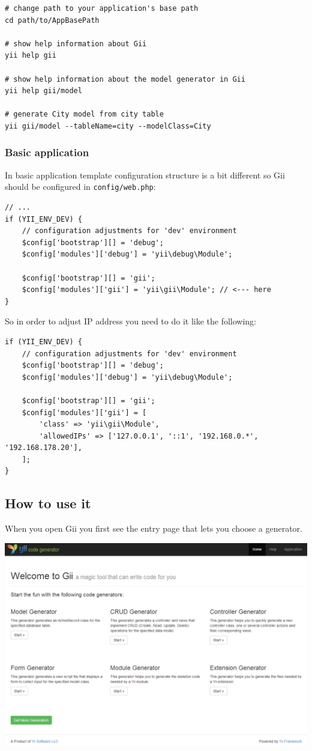 \begin{lstlisting}
# change path to your application's base path
cd path/to/AppBasePath

# show help information about Gii
yii help gii

# show help information about the model generator in Gii
yii help gii/model

# generate City model from city table
yii gii/model --tableName=city --modelClass=City
\end{lstlisting}
\subsubsection{Basic application}
In basic application template configuration structure is a bit different so Gii should be configured in
\lstinline|config/web.php|:

\lstset{language=php}\begin{lstlisting}
// ...
if (YII_ENV_DEV) {
    // configuration adjustments for 'dev' environment
    $config['bootstrap'][] = 'debug';
    $config['modules']['debug'] = 'yii\debug\Module';

    $config['bootstrap'][] = 'gii';
    $config['modules']['gii'] = 'yii\gii\Module'; // <--- here
}
\end{lstlisting}
So in order to adjust IP address you need to do it like the following:

\lstset{language=php}\begin{lstlisting}
if (YII_ENV_DEV) {
    // configuration adjustments for 'dev' environment
    $config['bootstrap'][] = 'debug';
    $config['modules']['debug'] = 'yii\debug\Module';

    $config['bootstrap'][] = 'gii';
    $config['modules']['gii'] = [
        'class' => 'yii\gii\Module',
        'allowedIPs' => ['127.0.0.1', '::1', '192.168.0.*', '192.168.178.20'],
    ];
}
\end{lstlisting}
\subsection{How to use it}
When you open Gii you first see the entry page that lets you choose a generator.

\noindent\includegraphics[width=\textwidth]{images/gii-entry.png}

